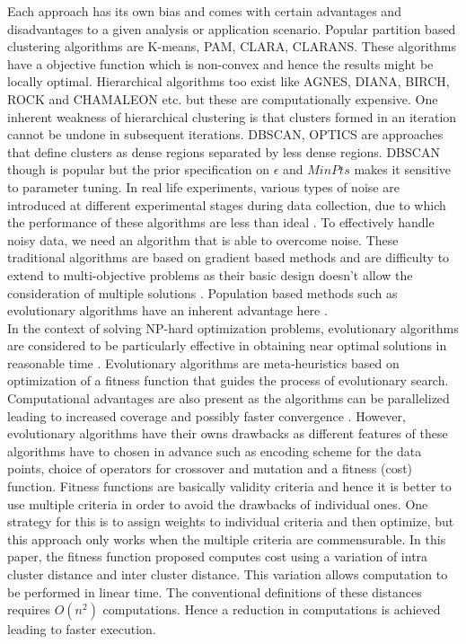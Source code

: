 \documentclass[conference]{IEEEtran}
\begin{document}
Each approach has its own bias and comes with certain advantages and disadvantages to a given analysis or application scenario. Popular partition based clustering algorithms are K-means, PAM, CLARA, CLARANS. These algorithms have a objective function which is non-convex and hence the results might be locally optimal. Hierarchical algorithms too exist like AGNES, DIANA, BIRCH, ROCK and CHAMALEON etc. but these are computationally expensive. One inherent weakness of hierarchical clustering is that clusters formed in an iteration cannot be undone in subsequent iterations. DBSCAN, OPTICS are approaches that define clusters as dense regions separated by less dense regions. DBSCAN though is popular but the prior specification on $\epsilon$ and $MinPts$ makes it sensitive to parameter tuning. In real life experiments, various types of noise are introduced at different experimental stages during data collection, due to which the performance of these algorithms are less than ideal \cite{hur} \cite{ma}. To effectively handle noisy data, we need an algorithm that is able to overcome noise. These traditional algorithms are based on gradient based methods and are difficulty to extend to multi-objective problems as their basic design doesn't allow the consideration of multiple solutions \cite{zha} \cite{luo}. Population based methods such as evolutionary algorithms have an inherent advantage here \cite{muk} \cite{muktwo}.\\

In the context of solving NP-hard optimization problems, evolutionary algorithms are considered to be particularly effective in obtaining near optimal solutions in reasonable time \cite{lih} \cite{sid}. Evolutionary algorithms are meta-heuristics based on optimization of a fitness function that guides the process of evolutionary search. Computational advantages are also present as the algorithms can be parallelized leading to increased coverage and possibly faster convergence \cite{lin}. However, evolutionary algorithms have their owns drawbacks as different features of these algorithms have to chosen in advance such as encoding scheme for the data points, choice of operators for crossover and mutation and a fitness (cost) function. Fitness functions are basically validity criteria and hence it is better to use multiple criteria in order to avoid the drawbacks of individual ones. One strategy for this is to assign weights to individual criteria and then optimize, but this approach only works when the multiple criteria are commensurable. In this paper, the fitness function proposed computes cost using a variation of intra cluster distance and inter cluster distance. This variation allows computation to be performed in linear time. The conventional definitions of these distances requires $O(n^2)$ computations. Hence a reduction in computations is achieved leading to faster execution.\\
\end{document}
